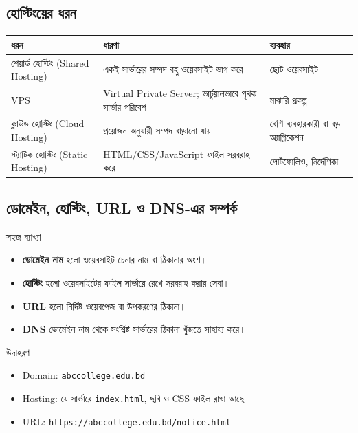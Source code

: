 \subsection{হোস্টিংয়ের ধরন}

\begin{center}
\begin{tabular}{|p{}|p{}|p{}|}
\hline
\textbf{ধরন} & \textbf{ধারণা} & \textbf{ব্যবহার} \\
\hline
শেয়ার্ড হোস্টিং (Shared Hosting) & একই সার্ভারের সম্পদ বহু ওয়েবসাইট ভাগ করে & ছোট ওয়েবসাইট \\
\hline
VPS & Virtual Private Server; ভার্চুয়ালভাবে পৃথক সার্ভার পরিবেশ & মাঝারি প্রকল্প \\
\hline
ক্লাউড হোস্টিং (Cloud Hosting) & প্রয়োজন অনুযায়ী সম্পদ বাড়ানো যায় & বেশি ব্যবহারকারী বা বড় অ্যাপ্লিকেশন \\
\hline
স্ট্যাটিক হোস্টিং (Static Hosting) & HTML/CSS/JavaScript ফাইল সরবরাহ করে & পোর্টফোলিও, নির্দেশিকা \\
\hline
\end{tabular}
\end{center}

\subsection{ডোমেইন, হোস্টিং, URL ও DNS-এর সম্পর্ক}

\begin{keypointbox}{সহজ ব্যাখ্যা}
\begin{itemize}
\item \textbf{ডোমেইন নাম} হলো ওয়েবসাইট চেনার নাম বা ঠিকানার অংশ।
\item \textbf{হোস্টিং} হলো ওয়েবসাইটের ফাইল সার্ভারে রেখে সরবরাহ করার সেবা।
\item \textbf{URL} হলো নির্দিষ্ট ওয়েবপেজ বা উপকরণের ঠিকানা।
\item \textbf{DNS} ডোমেইন নাম থেকে সংশ্লিষ্ট সার্ভারের ঠিকানা খুঁজতে সাহায্য করে।
\end{itemize}
\end{keypointbox}

\begin{examplebox}{উদাহরণ}
\begin{itemize}
\item Domain: \texttt{abccollege.edu.bd}
\item Hosting: যে সার্ভারে \texttt{index.html}, ছবি ও CSS ফাইল রাখা আছে
\item URL: \texttt{https://abccollege.edu.bd/notice.html}
\end{itemize}
\end{examplebox}

